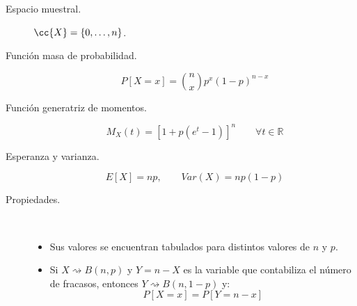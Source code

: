 \begin{description}
    \item [Espacio muestral.] $\cc{X} = \{0, \ldots, n\}$.
    \item [Función masa de probabilidad.] 
        \begin{equation*}
            P[X=x] = \binom{n}{x}p^x{(1-p)}^{n-x}
        \end{equation*}
    \item [Función generatriz de momentos.] 
        \begin{equation*}
            M_X(t) = {\left[1+p(e^t-1)\right]}^{n} \qquad \forall t\in \mathbb{R}
        \end{equation*}
    \item [Esperanza y varianza.] 
        \begin{equation*}
            E[X] = np, \qquad Var(X) = np(1-p)
        \end{equation*}
    \item [Propiedades.]\ \\
        \begin{itemize}
            \item Sus valores se encuentran tabulados para distintos valores de $n$ y $p$.
            \item Si $X\rightsquigarrow B(n,p)$ y $Y=n-X$ es la variable que contabiliza el número de fracasos, entonces $Y\rightsquigarrow B(n,1-p)$ y:
                \begin{equation*}
                    P[X=x] = P[Y=n-x]
                \end{equation*}
        \end{itemize}
\end{description}

